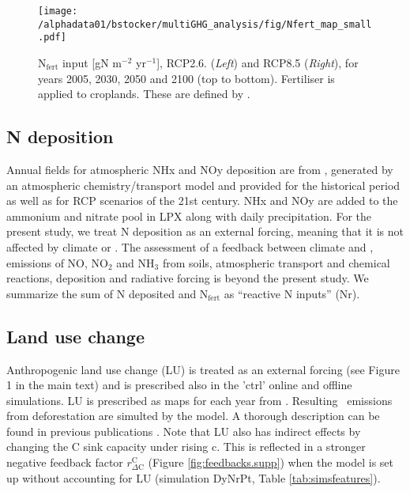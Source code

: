 %
\begin{figure}[ht!]
\begin{center}
\noindent\texttt{[image: /alphadata01/bstocker/multiGHG\_analysis/fig/Nfert\_map\_small.pdf]}
\end{center}
\caption[N fertiliser application maps]{N$_{\mathrm{fert}}$ input [gN m$^{-2}$ yr$^{-1}$], RCP2.6. ({\sl Left}) and RCP8.5 ({\sl Right}), for years 2005, 2030, 2050 and 2100 (top to bottom). Fertiliser is applied to croplands. These are defined by \citet{hurtt06gcb}.}
\label{fig:nfertmaps}
\end{figure}

\subsection{N deposition}
\label{sec:nfert}
Annual fields for atmospheric NHx and NOy deposition are from \citet{lamarque11cc}, generated by an atmospheric chemistry/transport model and provided for the historical period as well as for RCP scenarios of the 21st century. NHx and NOy are added to the ammonium and nitrate pool in LPX along with daily precipitation. For the present study, we treat N deposition as an external forcing, meaning that it is not affected by climate or \coo . The assessment of a feedback between climate and \coo , emissions of NO, NO$_2$ and NH$_3$ from soils, atmospheric transport and chemical reactions, deposition and radiative forcing is beyond the present study. We summarize the sum of N deposited and N$_{\mathrm{fert}}$ as ``reactive N inputs'' (Nr).


\subsection{Land use change}
\label{sec:landuse}
Anthropogenic land use change (LU) is treated as an external forcing (see Figure 1 in the main text) and is prescribed also in the 'ctrl' online and offline simulations. LU is prescribed as maps for each year from \citet{hurtt06gcb}. Resulting \coo\ emissions from deforestation are simulted by the model. A thorough description can be found in previous publications \citep{strassmann08tel,stocker11bg}. Note that LU also has indirect effects by changing the C sink capacity under rising c\coo  \citep{strassmann08tel}. This is reflected in a stronger negative feedback factor $r^{\mathrm{C}}_{\Delta\mathrm{C}}$ (Figure \ref{fig:feedbacks.supp}) when the model is set up without accounting for LU (simulation DyNrPt, Table \ref{tab:simsfeatures}). 


